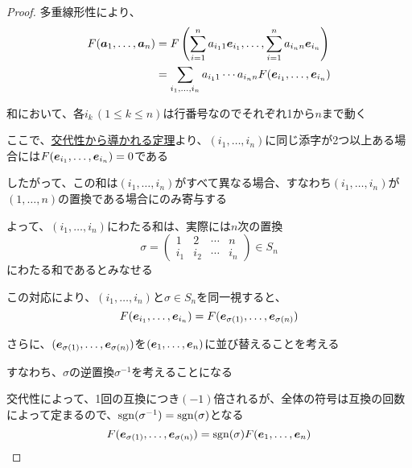 \documentclass[../../../topic_linear-algebra]{subfiles}
\begin{document}
\begin{proof}
  多重線形性により、
  \begin{align*}
    F(\vb*{a}_1, \ldots, \vb*{a}_n) & = F \left( \sum_{i=1}^n a_{i_1 1} \vb*{e}_{i_1}, \ldots, \sum_{i=1}^n a_{i_n n} \vb*{e}_{i_n} \right) \\
                                    & = \sum_{i_1, \ldots, i_n} a_{i_1 1} \cdots a_{i_n n} F(\vb*{e}_{i_1}, \ldots, \vb*{e}_{i_n})
  \end{align*}

  和において、各$i_k \, (1 \leq k \leq n)$は行番号なのでそれぞれ1から$n$まで動く

  \br

  ここで、\hyperref[thm:det-zero-if-columns-repeat]{交代性から導かれる定理}より、$(i_1, \ldots, i_n)$に同じ添字が2つ以上ある場合には$F(\vb*{e}_{i_1}, \ldots, \vb*{e}_{i_n}) = 0$である

  したがって、この和は$(i_1, \ldots, i_n)$がすべて異なる場合、すなわち$(i_1, \ldots, i_n)$が$(1, \ldots, n)$の置換である場合にのみ寄与する

  \br

  よって、$(i_1, \ldots, i_n)$にわたる和は、実際には$n$次の置換
  \begin{equation*}
    \sigma = \begin{pmatrix}
      1   & 2   & \cdots & n   \\
      i_1 & i_2 & \cdots & i_n
    \end{pmatrix} \in S_n
  \end{equation*}
  にわたる和であるとみなせる

  \br

  この対応により、$(i_1, \ldots, i_n)$と$\sigma \in S_n$を同一視すると、
  \begin{equation*}
    F(\vb*{e}_{i_1}, \ldots, \vb*{e}_{i_n}) = F(\vb*{e}_{\sigma(1)}, \ldots, \vb*{e}_{\sigma(n)})
  \end{equation*}

  さらに、$(\vb*{e}_{\sigma(1)}, \ldots, \vb*{e}_{\sigma(n)})$を$(\vb*{e}_1, \ldots, \vb*{e}_n)$に並び替えることを考える

  すなわち、$\sigma$の逆置換$\sigma^{-1}$を考えることになる

  交代性によって、1回の互換につき$(-1)$倍されるが、全体の符号は互換の回数によって定まるので、$\operatorname{sgn}(\sigma^{-1}) = \operatorname{sgn}(\sigma)$となる
  \begin{equation*}
    F(\vb*{e}_{\sigma(1)}, \ldots, \vb*{e}_{\sigma(n)}) = \operatorname{sgn}(\sigma) F(\vb*{e}_1, \ldots, \vb*{e}_n)
  \end{equation*}


\end{proof}
\end{document}
